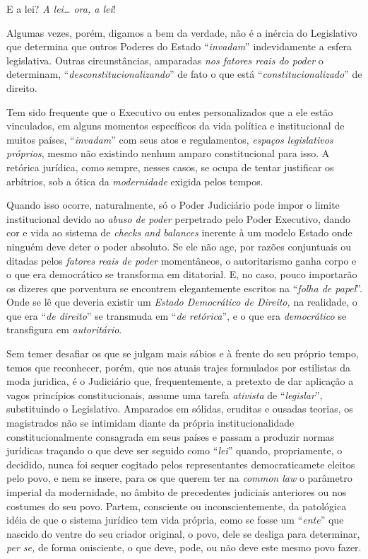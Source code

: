 E a lei? \emph{A lei\ldots{} ora, a lei}!

Algumas vezes, porém, digamos a bem da verdade, não é a inércia do
Legislativo que determina que outros Poderes do Estado
``\emph{invadam}'' indevidamente a esfera legislativa. Outras
circunstâncias, amparadas \emph{nos fatores reais do poder} o
determinam, ``\emph{desconstitucionalizando}'' de fato o que está
``\emph{constitucionalizado}'' de direito.

Tem sido frequente que o Executivo ou entes personalizados que a ele
estão vinculados, em alguns momentos específicos da vida política e
institucional de muitos países, ``\emph{invadam}'' com seus atos e
regulamentos, \emph{espaços legislativos próprios}, mesmo não existindo
nenhum amparo constitucional para isso. A retórica jurídica, como
sempre, nesses casos, se ocupa de tentar justificar os arbítrios, sob a
ótica da \emph{modernidade} exigida pelos tempos.

Quando isso ocorre, naturalmente, só o Poder Judiciário pode impor o
limite institucional devido ao \emph{abuso de poder} perpetrado pelo
Poder Executivo, dando cor e vida ao sistema de \emph{checks and
balances} inerente à um modelo Estado onde ninguém deve deter o poder
absoluto. Se ele não age, por razões conjuntuais ou ditadas pelos
\emph{fatores reais de poder} momentâneos, o autoritarismo ganha corpo e
o que era democrático se transforma em ditatorial. E, no caso, pouco
importarão os dizeres que porventura se encontrem elegantemente escritos
na ``\emph{folha de papel}''. Onde se lê que deveria existir um
\emph{Estado Democrático de Direito,} na realidade, o que era ``\emph{de
direito}'' se transmuda em ``\emph{de retórica}'', e o que era
\emph{democrático} se transfigura em \emph{autoritário}.

Sem temer desafiar os que se julgam mais sábios e à frente do seu
próprio tempo, temos que reconhecer, porém, que nos atuais trajes
formulados por estilistas da moda juridica, é o Judiciário que,
frequentemente, a pretexto de dar aplicação a vagos princípios
constitucionais, assume uma tarefa \emph{ativista} de
``\emph{legislar}'', substituindo o Legislativo. Amparados em sólidas,
eruditas e ousadas teorias, os magistrados não se intimidam diante da
própria institucionalidade constitucionalmente consagrada em seus países
e passam a produzir normas jurídicas traçando o que deve ser seguido
como ``\emph{lei}'' quando, propriamente, o decidido, nunca foi sequer
cogitado pelos representantes democraticamete eleitos pelo povo, e nem
se insere, para os que querem ter na \emph{common law} o parâmetro
imperial da modernidade, no âmbito de precedentes judiciais anteriores
ou nos costumes do seu povo. Partem, consciente ou inconscientemente, da
patológica idéia de que o sistema jurídico tem vida própria, como se
fosse um ``\emph{ente}'' que nascido do ventre do seu criador original,
o povo, dele se desliga para determinar, \emph{per se,} de forma
onisciente, o que deve, pode, ou não deve este mesmo povo fazer.

